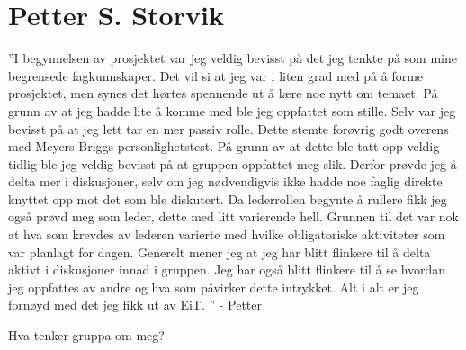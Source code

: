 \section{Petter S. Storvik}
''I begynnelsen av prosjektet var jeg veldig bevisst på det jeg tenkte på som mine begrensede fagkunnskaper. 
Det vil si at jeg var i liten grad med på å forme prosjektet, men synes det hørtes spennende ut å lære noe nytt om temaet. 
På grunn av at jeg hadde lite å komme med ble jeg oppfattet som stille. 
Selv var jeg bevisst på at jeg lett tar en mer passiv rolle. 
Dette stemte forøvrig godt overens med Meyers-Briggs personlighetstest. 
På grunn av at dette ble tatt opp veldig tidlig ble jeg veldig bevisst på at gruppen oppfattet meg slik. 
Derfor prøvde jeg å delta mer i diskusjoner, selv om jeg nødvendigvis ikke hadde noe faglig direkte knyttet opp mot det som ble diskutert. 
Da lederrollen begynte å rullere fikk jeg også prøvd meg som leder, dette med litt varierende hell. 
Grunnen til det var nok at hva som krevdes av lederen varierte med hvilke obligatoriske aktiviteter som var planlagt for dagen. 
Generelt mener jeg at jeg har blitt flinkere til å delta aktivt i diskusjoner innad i gruppen. 
Jeg har også blitt flinkere til å se hvordan jeg oppfattes av andre og hva som påvirker dette intrykket. 
Alt i alt er jeg fornøyd med det jeg fikk ut av EiT. '' \hfill - Petter
\vspace{\secspace}

Hva tenker gruppa om meg? 


